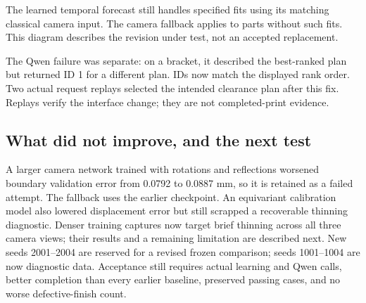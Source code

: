 \documentclass[10pt,letterpaper]{article}
\begin{document}
\begin{center}
\end{center}
The learned temporal forecast still handles specified fits using its matching
classical camera input. The camera fallback applies to parts without such fits.
This diagram describes the revision under test, not an accepted replacement.

The Qwen failure was separate: on a bracket, it described the best-ranked plan
but returned ID 1 for a different plan. IDs now match the displayed rank order.
Two actual request replays selected the intended clearance plan after this fix.
Replays verify the interface change; they are not completed-print evidence.

\subsection*{What did not improve, and the next test}
A larger camera network trained with rotations and reflections worsened boundary
validation error from 0.0792 to 0.0887 mm, so it is retained as a failed attempt.
The fallback uses the earlier checkpoint. An equivariant calibration model also
lowered displacement error but still scrapped a recoverable thinning diagnostic.
Denser training captures now target brief thinning across all three camera views;
their results and a remaining limitation are described next. New seeds 2001--2004 are reserved for
a revised frozen comparison; seeds 1001--1004 are now diagnostic data. Acceptance
still requires actual learning and Qwen calls, better completion than every
earlier baseline, preserved passing cases, and no worse defective-finish count.
\end{document}
